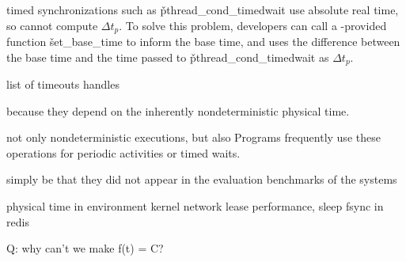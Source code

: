 \pthread timed synchronizations such as \v{pthread\_cond\_timedwait} use
absolute real time, so \parrot cannot compute $\Delta t_p$.  To solve this
problem, developers can call a \parrot-provided function \v{set\_base\_time}
to inform \parrot the base time, and \parrot uses the difference between the
base time and the time passed to \v{pthread\_cond\_timedwait} as $\Delta
t_p$.

list of timeouts \parrot handles

because they depend on the inherently nondeterministic physical time.




not only nondeterministic executions, but also
Programs frequently use these operations for periodic activities or timed
waits.

simply be that they did not appear in the evaluation benchmarks of the systems


  physical time in environment
    kernel
    network lease
  performance, sleep fsync in redis

  Q: why can't we make f(t) = C?

